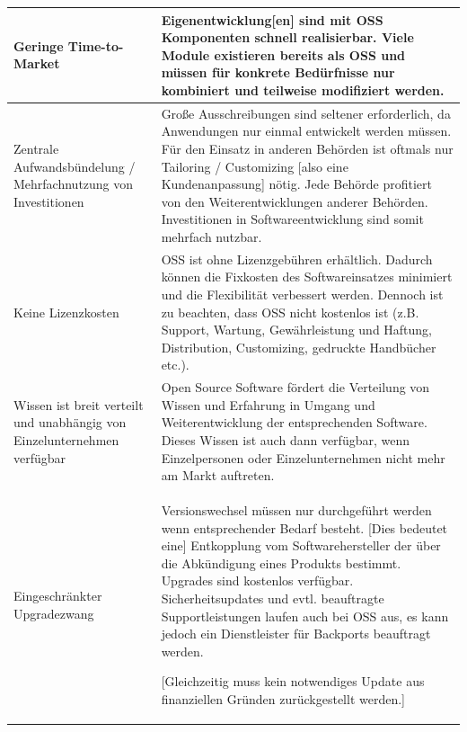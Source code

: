 \documentclass[a4paper]{scrartcl}
\begin{document}
\begin{supertabular}{|m{1.8900598in}m{4.77126in}|}
\hline

Geringe Time-to-Market &

Eigenentwicklung[en] sind mit OSS Komponenten schnell realisierbar. Viele Module
existieren bereits als OSS und müssen für konkrete Bedürfnisse nur kombiniert
und teilweise modifiziert
werden.\\

\hline

Zentrale Aufwandsbündelung / Mehrfachnutzung von Investitionen &

Große Ausschreibungen sind seltener erforderlich, da Anwendungen nur einmal
entwickelt werden müssen.  Für den Einsatz in anderen Behörden ist oftmals nur
Tailoring / Customizing [also eine Kundenanpassung] nötig. Jede Behörde
profitiert von den Weiterentwicklungen anderer Behörden.  Investitionen in
Softwareentwicklung sind somit mehrfach
nutzbar.\\

\hline

Keine Lizenzkosten &

OSS ist ohne Lizenzgebühren erhältlich. Dadurch können die Fixkosten des
Softwareinsatzes minimiert und die Flexibilität verbessert werden.  Dennoch ist
zu beachten, dass OSS nicht kostenlos ist (z.B. Support, Wartung, Gewährleistung
und Haftung, Distribution, Customizing, gedruckte Handbücher
etc.).\\

\hline

Wissen ist breit verteilt und unabhängig von Einzelunternehmen verfügbar &

Open Source Software fördert die Verteilung von Wissen und Erfahrung in Umgang
und Weiterentwicklung der entsprechenden Software. Dieses Wissen ist auch dann
verfügbar, wenn Einzelpersonen oder Einzelunternehmen nicht mehr am Markt
auftreten.\\

\hline

Eingeschränkter Upgradezwang &

Versionswechsel müssen nur durchgeführt werden wenn entsprechender Bedarf
besteht. [Dies bedeutet eine] Entkopplung vom Softwarehersteller der über die
Abkündigung eines Produkts bestimmt. Upgrades sind kostenlos verfügbar.
Sicherheitsupdates und evtl. beauftragte Supportleistungen laufen auch bei OSS
aus, es kann jedoch ein Dienstleister für Backports beauftragt werden.

[Gleichzeitig muss kein notwendiges Update aus
finanziellen Gründen zurückgestellt werden.]\\

\hline
\end{supertabular}
\end{document}
